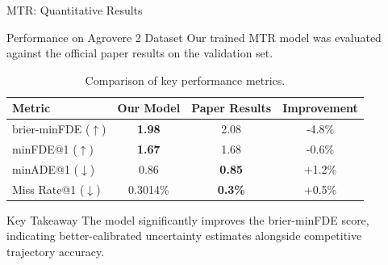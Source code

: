 \documentclass[10pt,aspectratio=169]{beamer}
\begin{document}
\begin{frame}{MTR: Quantitative Results}
    \begin{block}{Performance on Agrovere 2 Dataset}
        Our trained MTR model was evaluated against the official paper results on the validation set.
    \end{block}
    \begin{table}
        \centering
        \renewcommand{\arraystretch}{1.3}
        \begin{tabular}{|l|c|c|c|}
            \hline
            \textbf{Metric} & \textbf{Our Model} & \textbf{Paper Results} & \textbf{Improvement} \\
            \hline
            brier-minFDE ($\uparrow$) & \textbf{1.98} & 2.08 & \textcolor{mygreen}{-4.8\%} \\
            minFDE@1 ($\uparrow$) & \textbf{1.67} & 1.68 & \textcolor{mygreen}{-0.6\%} \\
            minADE@1 ($\downarrow$) & 0.86 & \textbf{0.85} & \textcolor{myred}{+1.2\%} \\
            Miss Rate@1 ($\downarrow$) & 0.3014\% & \textbf{0.3\%} & \textcolor{myred}{+0.5\%} \\
            \hline
        \end{tabular}
        \caption{Comparison of key performance metrics.}
    \end{table}
    \begin{alertblock}{Key Takeaway}
        The model significantly improves the brier-minFDE score, indicating better-calibrated uncertainty estimates alongside competitive trajectory accuracy.
    \end{alertblock}
\end{frame}
\end{document}
